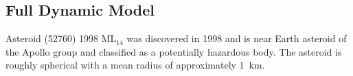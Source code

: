 \subsection{Full Dynamic Model }\label{sec:dynamic_exploration}
Asteroid (\num{52760}) \num{1998} \(\text{ML}_{14}\) was discovered in \num{1998} and is near Earth asteroid of the Apollo group and classified as a potentially hazardous body.
The asteroid is roughly spherical with a mean radius of approximately \SI{1}{\kilo\meter}.
\begin{figure}[htbp]
    \centering
    ~


\end{figure}
